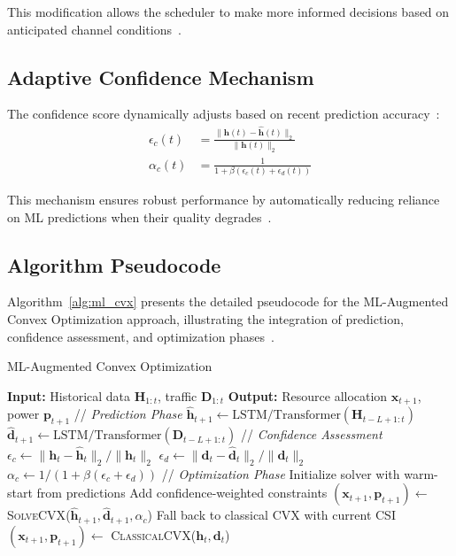 \documentclass[conference]{IEEEtran}
\begin{document}
This modification allows the scheduler to make more informed decisions based on anticipated channel conditions~\cite{lstm_wireless}.

\subsection{Adaptive Confidence Mechanism}

The confidence score dynamically adjusts based on recent prediction accuracy~\cite{adaptive_algorithms,confidence_estimation}:
\begin{align}
\epsilon_c(t) &= \frac{\|\mathbf{h}(t) - \hat{\mathbf{h}}(t)\|_2}{\|\mathbf{h}(t)\|_2} \\
\alpha_c(t) &= \frac{1}{1 + \beta(\epsilon_c(t) + \epsilon_d(t))}
\end{align}

This mechanism ensures robust performance by automatically reducing reliance on ML predictions when their quality degrades~\cite{robust_ml}.

\subsection{Algorithm Pseudocode}

Algorithm~\ref{alg:ml_cvx} presents the detailed pseudocode for the ML-Augmented Convex Optimization approach, illustrating the integration of prediction, confidence assessment, and optimization phases~\cite{boyd_convex}.

\begin{algorithm}[h]
\caption{ML-Augmented Convex Optimization}
\label{alg:ml_cvx}
\begin{algorithmic}[1]
\STATE \textbf{Input:} Historical data $\mathbf{H}_{1:t}$, traffic $\mathbf{D}_{1:t}$
\STATE \textbf{Output:} Resource allocation $\mathbf{x}_{t+1}$, power $\mathbf{p}_{t+1}$
\STATE
\STATE // \textit{Prediction Phase}
\STATE $\hat{\mathbf{h}}_{t+1} \leftarrow \text{LSTM/Transformer}(\mathbf{H}_{t-L+1:t})$
\STATE $\hat{\mathbf{d}}_{t+1} \leftarrow \text{LSTM/Transformer}(\mathbf{D}_{t-L+1:t})$
\STATE
\STATE // \textit{Confidence Assessment}
\STATE $\epsilon_c \leftarrow \|\mathbf{h}_t - \hat{\mathbf{h}}_t\|_2 / \|\mathbf{h}_t\|_2$
\STATE $\epsilon_d \leftarrow \|\mathbf{d}_t - \hat{\mathbf{d}}_t\|_2 / \|\mathbf{d}_t\|_2$
\STATE $\alpha_c \leftarrow 1/(1 + \beta(\epsilon_c + \epsilon_d))$
\STATE
\STATE // \textit{Optimization Phase}
    \STATE Initialize solver with warm-start from predictions
    \STATE Add confidence-weighted constraints
    \STATE $(\mathbf{x}_{t+1}, \mathbf{p}_{t+1}) \leftarrow$ \textsc{SolveCVX}($\hat{\mathbf{h}}_{t+1}, \hat{\mathbf{d}}_{t+1}, \alpha_c$)
\ELSE
    \STATE Fall back to classical CVX with current CSI
    \STATE $(\mathbf{x}_{t+1}, \mathbf{p}_{t+1}) \leftarrow$ \textsc{ClassicalCVX}($\mathbf{h}_t, \mathbf{d}_t$)
\ENDIF
\end{algorithmic}
\end{algorithm}
\end{document}
